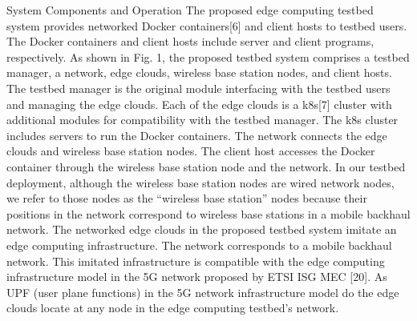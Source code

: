 \documentclass[conference]{IEEEtran}
\begin{document}
 System Components and Operation
The proposed edge computing testbed system provides networked Docker containers[6] and client hosts to testbed
users. The Docker containers and client hosts include server
and client programs, respectively. As shown in Fig. 1, the
proposed testbed system comprises a testbed manager, a network, edge clouds, wireless base station nodes, and client
hosts. The testbed manager is the original module interfacing with the testbed users and managing the edge clouds.
Each of the edge clouds is a k8s[7] cluster with additional
modules for compatibility with the testbed manager. The
k8s cluster includes servers to run the Docker containers.
The network connects the edge clouds and wireless base station nodes. The client host accesses the Docker container
through the wireless base station node and the network. In
our testbed deployment, although the wireless base station
nodes are wired network nodes, we refer to those nodes as
the “wireless base station” nodes because their positions in
the network correspond to wireless base stations in a mobile
backhaul network.
The networked edge clouds in the proposed testbed
system imitate an edge computing infrastructure. The network corresponds to a mobile backhaul network. This imitated infrastructure is compatible with the edge computing
infrastructure model in the 5G network proposed by ETSI
ISG MEC [20]. As UPF (user plane functions) in the 5G
network infrastructure model do the edge clouds locate at
any node in the edge computing testbed’s network.
\end{document}
